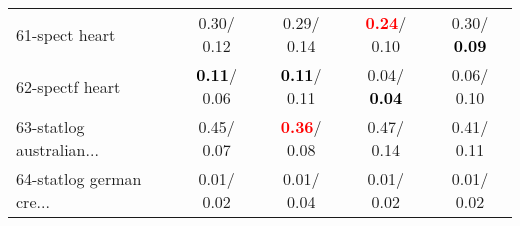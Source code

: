 \begin{table}[h]
\begin{center}
\begin{tabular}{lc|c|c|c}
61-spect heart &   0.30/  0.12 &   0.29/  0.14 & \textcolor{red}{\textbf{  0.24}}/  0.10 &   0.30/\textcolor{black}{\textbf{  0.09}} \\
62-spectf heart & \textcolor{black}{\textbf{  0.11}}/  0.06 & \textcolor{black}{\textbf{  0.11}}/  0.11 &   0.04/\textcolor{black}{\textbf{  0.04}} &   0.06/  0.10 \\
63-statlog australian... &   0.45/  0.07 & \textcolor{red}{\textbf{  0.36}}/  0.08 &   0.47/  0.14 &   0.41/  0.11 \\
64-statlog german cre... &   0.01/  0.02 &   0.01/  0.04 &   0.01/  0.02 &   0.01/  0.02 \\\end{tabular}\label{stratsALCKappa1bVFDTRedux}
\end{center}
\end{table}
